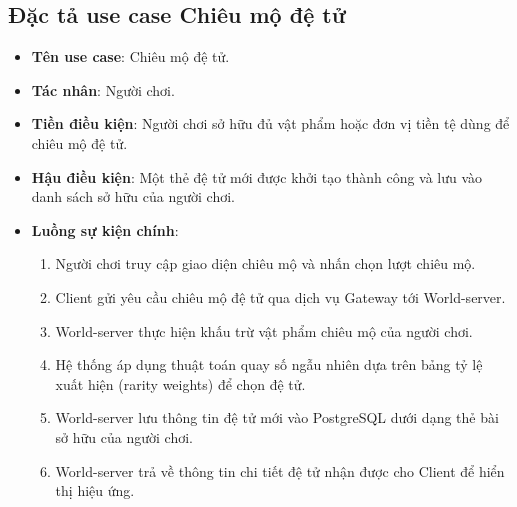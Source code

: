 \documentclass[../Project.tex]{subfiles}
\begin{document}
\subsection{Đặc tả use case Chiêu mộ đệ tử}
\begin{itemize}
    \item \textbf{Tên use case}: Chiêu mộ đệ tử.
    \item \textbf{Tác nhân}: Người chơi.
    \item \textbf{Tiền điều kiện}: Người chơi sở hữu đủ vật phẩm hoặc đơn vị tiền tệ dùng để chiêu mộ đệ tử.
    \item \textbf{Hậu điều kiện}: Một thẻ đệ tử mới được khởi tạo thành công và lưu vào danh sách sở hữu của người chơi.
    \item \textbf{Luồng sự kiện chính}:
    \begin{enumerate}
        \item Người chơi truy cập giao diện chiêu mộ và nhấn chọn lượt chiêu mộ.
        \item Client gửi yêu cầu chiêu mộ đệ tử qua dịch vụ Gateway tới World-server.
        \item World-server thực hiện khấu trừ vật phẩm chiêu mộ của người chơi.
        \item Hệ thống áp dụng thuật toán quay số ngẫu nhiên dựa trên bảng tỷ lệ xuất hiện (rarity weights) để chọn đệ tử.
        \item World-server lưu thông tin đệ tử mới vào PostgreSQL dưới dạng thẻ bài sở hữu của người chơi.
        \item World-server trả về thông tin chi tiết đệ tử nhận được cho Client để hiển thị hiệu ứng.
    \end{enumerate}
\end{itemize}
\end{document}
